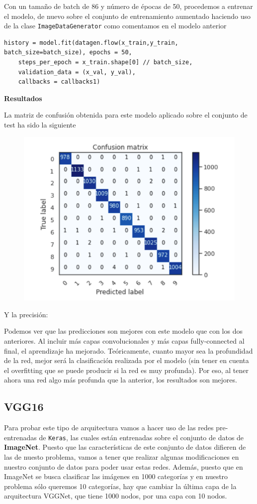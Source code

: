 \documentclass[a4paper,11pt]{article}
\begin{document}
Con un tamaño de batch de 86 y número de épocas de 50, procedemos a entrenar el modelo, de nuevo sobre el conjunto de entrenamiento aumentado haciendo uso de la clase \texttt{ImageDataGenerator} como comentamos en el modelo anterior
\begin{verbatim}
history = model.fit(datagen.flow(x_train,y_train, batch_size=batch_size), epochs = 50, 
	steps_per_epoch = x_train.shape[0] // batch_size,
	validation_data = (x_val, y_val),
	callbacks = callbacks1)
\end{verbatim}
\textbf{Resultados}

La matriz de confusión obtenida para este modelo aplicado sobre el conjunto de test ha sido la siguiente
\begin{figure}[H]
	\centering
	\includegraphics[width=0.8\linewidth]{img/cnn4}
	\caption{}
	\label{fig:cnn4}
\end{figure}


Y la precisión: 

Podemos ver que las predicciones son mejores con este modelo que con los dos anteriores. Al incluir más capas convolucionales y más capas fully-connected al final, el aprendizaje ha mejorado. Teóricamente, cuanto mayor sea la profundidad de la red, mejor será la clasificación realizada por el modelo (sin tener en cuenta el overfitting que se puede producir si la red es muy profunda). Por eso, al tener ahora una red algo más profunda que la anterior, los resultados son mejores. 

\subsection{VGG16}

Para probar este tipo de arquitectura vamos a hacer uso de las redes pre-entrenadas de \texttt{Keras}, las cuales están entrenadas sobre el conjunto de datos de \textbf{ImageNet}. Puesto que las características de este conjunto de datos difieren de las de nuesto problema, vamos a tener que realizar algunas modificaciones en nuestro conjunto de datos para poder usar estas redes. Además, puesto que en ImageNet se busca clasificar las imágenes en 1000 categorías y en nuestro problema sólo queremos 10 categorías, hay que cambiar la última capa de la arquitectura VGGNet, que tiene 1000 nodos, por una capa con 10 nodos. 
\end{document}

